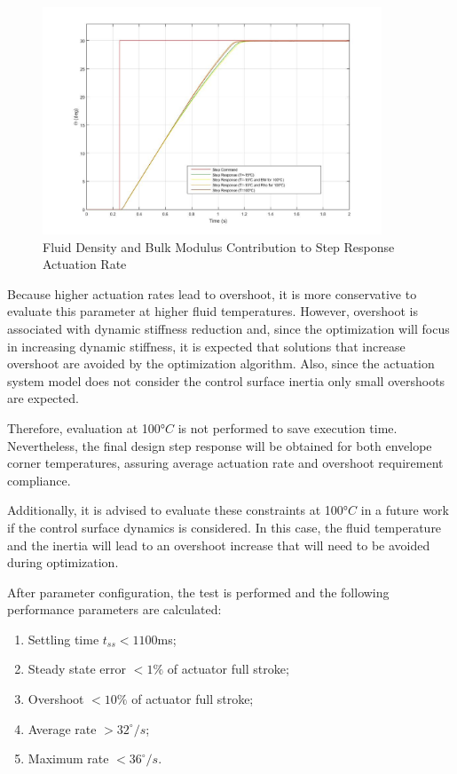 \begin{figure}[H]
	\centering
	\centerline{\includegraphics[width=0.9\textwidth]{Figuras/4.DynamicStifinessOptimizationAlgorithm/4-3-1-FluidTemperature.jpg}}
	\caption{Fluid Density and Bulk Modulus Contribution to Step Response Actuation Rate}
	\label{fig:4_3_1_FluidTemperature}
\end{figure}

Because higher actuation rates lead to overshoot, it is more conservative to evaluate this parameter at higher fluid temperatures. However, overshoot is associated with dynamic stiffness reduction \cite{Ballesteros} and, since the optimization will focus in increasing dynamic stiffness, it is expected that solutions that increase overshoot are avoided by the optimization algorithm. Also, since the actuation system model does not consider the control surface inertia only small overshoots are expected.

Therefore, evaluation at 100$°C$ is not performed to save execution time. Nevertheless, the final design step response will be obtained for both envelope corner temperatures, assuring average actuation rate and overshoot requirement compliance.

Additionally, it is advised to evaluate these constraints at 100$°C$ in a future work if the control surface dynamics is considered. In this case, the fluid temperature and the inertia will lead to an overshoot increase that will need to be avoided during optimization.

After parameter configuration, the test is performed and the following performance parameters are calculated:

\begin{enumerate}
	\item Settling time $t_{ss} < 1100 $ms;
	\item Steady state error $< 1\%$ of actuator full stroke;
	\item Overshoot $< 10\%$ of actuator full stroke;
	\item Average rate $> 32^{\circ}/s$;
	\item Maximum rate $< 36^{\circ}/s$.
\end{enumerate}

